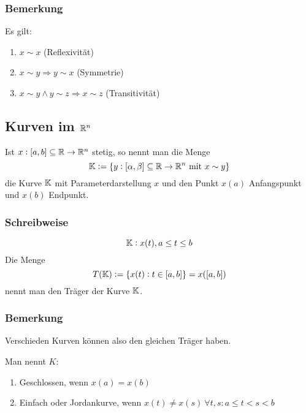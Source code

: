 \subsubsection{Bemerkung}
Es gilt:
\begin{enumerate}[label= (\alph*)]
    \item $x \sim x$ (Reflexivität)
    \item $x \sim y \Rightarrow y \sim x$ (Symmetrie)
    \item $x \sim y \land y \sim z \Rightarrow x \sim z$ (Transitivität)
\end{enumerate}

\subsection{Kurven im $\mathbb{R}^n$}
Ist $x: [a,b] \subseteq \mathbb{R} \rightarrow \mathbb{R}^n$ stetig, so nennt man die Menge
\begin{equation*}
    \mathbb{K} := \{y: [\alpha, \beta] \subseteq \mathbb{R} \rightarrow \mathbb{R}^n \text{ mit } x \sim y\}
\end{equation*}
die Kurve $\mathbb{K}$ mit Parameterdarstellung $x$ und den Punkt $x(a)$ Anfangspunkt und
$x(b)$ Endpunkt.

\subsubsection{Schreibweise}
\begin{equation*}
    \mathbb{K}: x(t), a \leq t \leq b
\end{equation*}
Die Menge
\begin{equation*}
    T(\mathbb{K}) := \{x(t): t \in [a,b]\} = x([a,b])
\end{equation*}
nennt man den Träger der Kurve $\mathbb{K}$.

\subsubsection{Bemerkung}
Verschieden Kurven können also den gleichen Träger haben.

Man nennt $K$:
\begin{enumerate}[label= (\alph*)]
    \item Geschlossen, wenn $x(a) = x(b)$
    \item Einfach oder Jordankurve, wenn $x(t) \neq x(s)\ \forall t,s: a \leq t < s <b$
\end{enumerate}


